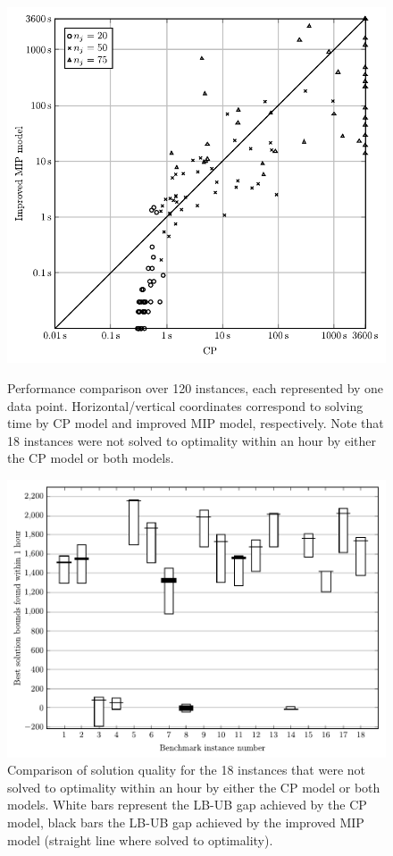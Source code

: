 \documentclass[oribibl]{llncs}
\begin{document}
\begin{figure}[t]
\begin{minipage}[t]{.475\textwidth}
\includegraphics[width=\textwidth]{scattercomp.pdf}
\caption{Performance comparison over 120 instances, each represented by one data
point. Horizontal/vertical coordinates correspond to solving time by CP model
and improved MIP model, respectively. Note that 18 instances were not solved to
optimality within an hour by either the CP model or both models.}
\label{fig:scattercomp}
\end{minipage} %
\hfill
\begin{minipage}[t]{.475\textwidth}
\centering
\includegraphics[width=\textwidth]{gapcomp.pdf}
\caption{Comparison of solution quality for the 18 instances that were not
solved to optimality within an hour by either the CP model or both models. White bars represent
the LB-UB gap achieved by the CP model, black bars the LB-UB gap achieved by the
improved MIP model (straight line where solved to optimality).}
\label{fig:gapcomp}
\end{minipage}
\end{figure}
\end{document}
